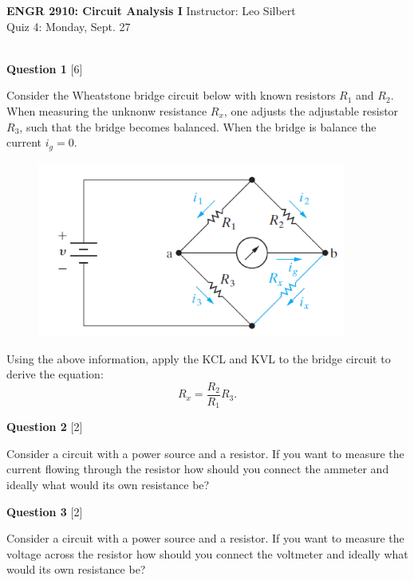 \documentclass[12pt]{article}
\begin{document}

\begin{center}
\hfil
{\large\bf {ENGR 2910: Circuit Analysis I}}
\hfill Instructor: Leo Silbert \\
Quiz 4: Monday, Sept. 27\\
\hrulefill\\
\end{center}




\noindent
\noindent
{\bf Question 1} [6]

Consider the Wheatstone bridge circuit below with known resistors $R_{1}$ and $R_{2}$. When measuring the unknonw resistance $R_{x}$, one adjusts the adjustable resistor $R_{3}$, such that the bridge becomes balanced. When the bridge is balance the current $i_{g} = 0$.
\begin{figure}[h!]
\centering
\includegraphics[width=4.0in]{Wheatstone.png}
\end{figure}
Using the above information, apply the KCL and KVL to the bridge circuit to derive the equation:
\[
R_{x} = \frac{R_{2}}{R_{1}}R_{3}.
\]

\newpage
\noindent
{\bf Question 2} [2]

Consider a circuit with a power source and a resistor. If you want to measure the current flowing through the resistor how should you connect the ammeter and ideally what would its own resistance be?

\vspace{3.0in}
\noindent
{\bf Question 3} [2]

Consider a circuit with a power source and a resistor. If you want to measure the voltage across the resistor how should you connect the voltmeter and ideally what would its own resistance be?
\end{document}
